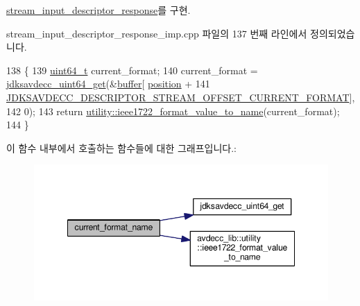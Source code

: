\hyperlink{classavdecc__lib_1_1stream__input__descriptor__response_a24176b56bc0f1873b27d00565bc397c5}{stream\+\_\+input\+\_\+descriptor\+\_\+response}를 구현.



stream\+\_\+input\+\_\+descriptor\+\_\+response\+\_\+imp.\+cpp 파일의 137 번째 라인에서 정의되었습니다.


\begin{DoxyCode}
138 \{
139     \hyperlink{parse_8c_aec6fcb673ff035718c238c8c9d544c47}{uint64\_t} current\_format;
140     current\_format = \hyperlink{group__endian_gac8c2b48b7d7db101708e0197e366ac42}{jdksavdecc\_uint64\_get}(&\hyperlink{classavdecc__lib_1_1descriptor__response__base__imp_a56ed84df35de10bdb65e72b184309497}{buffer}[
      \hyperlink{classavdecc__lib_1_1descriptor__response__base__imp_a7a04afe5347934be732ec70a70bd0a28}{position} +
141                                                    
      \hyperlink{group__descriptor__stream_ga7a5a95301a026cee8fb77bf0f575e93f}{JDKSAVDECC\_DESCRIPTOR\_STREAM\_OFFSET\_CURRENT\_FORMAT}],
142                                            0);
143     \textcolor{keywordflow}{return} \hyperlink{namespaceavdecc__lib_1_1utility_a65f055a50d3d236b67d30c1a7b8425c8}{utility::ieee1722\_format\_value\_to\_name}(current\_format);
144 \}
\end{DoxyCode}


이 함수 내부에서 호출하는 함수들에 대한 그래프입니다.\+:
\nopagebreak
\begin{figure}[H]
\begin{center}
\leavevmode
\includegraphics[width=348pt]{classavdecc__lib_1_1stream__input__descriptor__response__imp_a41ea895a8803b5e19ec9ebf1e6cc3a61_cgraph}
\end{center}
\end{figure}


